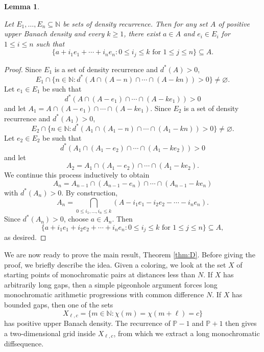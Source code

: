 \documentclass[10pt,a4paper]{amsart}
\newtheorem{lemma}{Lemma}
\begin{document}
\begin{lemma}\label{lem:density-grid}

Let $E_1,\dots,E_n \subseteq \mathbb{N}$ be sets of density recurrence. Then for any set $A$ of positive upper Banach density and every $k \geq 1$, there exist $a \in A$ and $e_i \in E_i$ for $1 \leq i \leq n$ such that $$ \{a+i_1e_1+\cdots+i_ne_n : 0 \leq i_j \leq k \text{ for } 1 \leq j \leq n\} \subseteq A. $$

\end{lemma}

\begin{proof}

Since $E_1$ is a set of density recurrence and $d^*(A)>0$, $$E_1 \cap\{n \in \mathbb{N} : d^*(A \cap (A-n) \cap \cdots \cap (A-kn))>0\} \neq \varnothing.$$ Let $e_1 \in E_1$ be such that $$d^*(A \cap (A-e_1) \cap \cdots \cap (A-ke_1))>0$$ and let $A_1=A \cap (A -e_1) \cap \cdots \cap (A-ke_1)$. Since $E_2$ is a set of density recurrence and $d^*(A_1)>0$, $$E_2 \cap \{n \in \mathbb{N} : d^*(A_1 \cap (A_1-n) \cap \cdots \cap (A_1-kn))>0\} \neq \varnothing.$$ Let $e_2 \in E_2$ be such that $$d^*(A_1 \cap (A_1-e_2) \cap \cdots \cap (A_1-ke_2))>0$$ and let $$A_2=A_1 \cap (A_1-e_2) \cap \cdots \cap (A_1-ke_2).$$ We continue this process inductively to obtain $$A_n=A_{n-1} \cap (A_{n-1}-e_n) \cap \cdots \cap (A_{n-1}-ke_n)$$ with $d^*(A_n)>0$. By construction, $$A_n=\bigcap_{0 \leq i_1,\dots,i_n \leq k}(A-i_1e_1-i_2e_2 - \cdots - i_ne_n).$$ Since $d^*(A_n)>0$, choose $a \in A_n$. Then $$ \{a+i_1e_1+i_2e_2+\cdots+i_ne_n : 0 \leq i_j \leq k \text{ for } 1 \leq j \leq n\} \subseteq A, $$ as desired. \end{proof}
    


We are now ready to prove the main result, Theorem \ref{thm:D}. Before giving the proof, we briefly describe the idea. Given a coloring, we look at the set $X$ of starting points of monochromatic pairs at distances less than $N$. If $X$ has arbitrarily long gaps, then a simple pigeonhole argument forces long monochromatic arithmetic progressions with common difference $N$. If $X$ has bounded gaps, then one of the sets $$X_{\ell,c}=\{m \in \mathbb{N} : \chi(m)=\chi(m+\ell)=c\}$$ has positive upper Banach density. The recurrence of $\mathbb{P}-1$ and $\mathbb{P}+1$ then gives a two-dimensional grid inside $X_{\ell,c}$, from which we extract a long monochromatic diffsequence.
\end{document}
